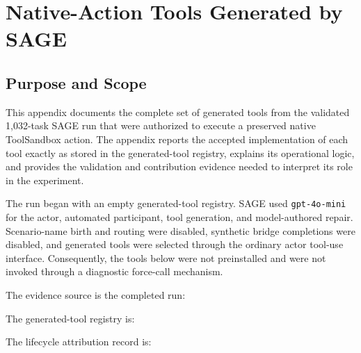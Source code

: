 \providecommand{\tightlist}{%
  \setlength{\itemsep}{0pt}\setlength{\parskip}{0pt}}

\chapter{Native-Action Tools Generated by SAGE}
\label{app:native-action-generated-tools}

\section{Purpose and Scope}\label{purpose-and-scope}

This appendix documents the complete set of generated tools from the
validated 1,032-task SAGE run that were authorized to execute a
preserved native ToolSandbox action. The appendix reports the accepted
implementation of each tool exactly as stored in the generated-tool
registry, explains its operational logic, and provides the validation
and contribution evidence needed to interpret its role in the
experiment.

The run began with an empty generated-tool registry. SAGE used
\texttt{gpt-4o-mini} for the actor, automated participant, tool
generation, and model-authored repair. Scenario-name birth and routing
were disabled, synthetic bridge completions were disabled, and generated
tools were selected through the ordinary actor tool-use interface.
Consequently, the tools below were not preinstalled and were not invoked
through a diagnostic force-call mechanism.

The evidence source is the completed run:


The generated-tool registry is:


The lifecycle attribution record is:


